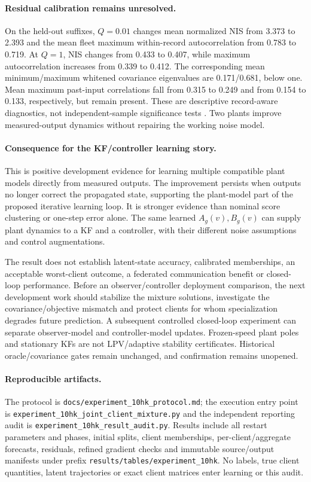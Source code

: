 \paragraph{Residual calibration remains unresolved.}
On the held-out suffixes, $Q=0.01$ changes mean normalized NIS from 3.373 to
2.393 and the mean fleet maximum within-record autocorrelation from 0.783 to
0.719. At $Q=1$, NIS changes from 0.433 to 0.407, while maximum
autocorrelation increases from 0.339 to 0.412. The corresponding mean
minimum/maximum whitened covariance eigenvalues are 0.171/0.681, below one.
Mean maximum past-input correlations fall from 0.315 to 0.249 and from
0.154 to 0.133, respectively, but remain present. These are descriptive
record-aware diagnostics, not independent-sample significance tests
\cite{mathworksResidual2026}. Two plants improve measured-output dynamics
without repairing the working noise model.

\paragraph{Consequence for the KF/controller learning story.}
This is positive development evidence for learning multiple compatible plant
models directly from measured outputs. The improvement persists when outputs
no longer correct the propagated state, supporting the plant-model part of
the proposed iterative learning loop. It is stronger evidence than nominal
score clustering or one-step error alone. The same learned $A_g(v),B_g(v)$
can supply plant dynamics to a KF and a controller, with their different
noise assumptions and control augmentations.

The result does not establish latent-state accuracy, calibrated memberships,
an acceptable worst-client outcome, a federated communication benefit or
closed-loop performance. Before an observer/controller deployment comparison,
the next development work should stabilize the mixture solutions, investigate
the covariance/objective mismatch and protect clients for whom specialization
degrades future prediction. A subsequent controlled closed-loop experiment
can separate observer-model and controller-model updates. Frozen-speed plant
poles and stationary KFs are not LPV/adaptive stability certificates. Historical
oracle/covariance gates remain unchanged, and confirmation remains unopened.

\paragraph{Reproducible artifacts.}
The protocol is \texttt{docs/experiment\_10hk\_protocol.md}; the execution
entry point is \texttt{experiment\_10hk\_joint\_client\_mixture.py} and the
independent reporting audit is \texttt{experiment\_10hk\_result\_audit.py}.
Results include all restart parameters and phases, initial splits, client
memberships, per-client/aggregate forecasts, residuals, refined gradient
checks and immutable source/output manifests under prefix
\texttt{results/tables/experiment\_10hk}. No labels, true client quantities,
latent trajectories or exact client matrices enter learning or this audit.
